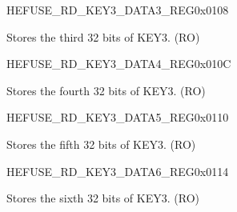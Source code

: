 \begin{register}{H}{EFUSE\_RD\_KEY3\_DATA3\_REG}{0x0108}\label{regdesc:EFUSERDKEY3DATA3REG}
%
\regnewline%
\begin{regdesc}\begin{reglist}
\label{fielddesc:EFUSEKEY3DATA3}\item [EFUSE\_KEY3\_DATA3] Stores the third 32 bits of KEY3. (RO)
\end{reglist}\end{regdesc}
\end{register}


\begin{register}{H}{EFUSE\_RD\_KEY3\_DATA4\_REG}{0x010C}\label{regdesc:EFUSERDKEY3DATA4REG}
%
\regnewline%
\begin{regdesc}\begin{reglist}
\label{fielddesc:EFUSEKEY3DATA4}\item [EFUSE\_KEY3\_DATA4] Stores the fourth 32 bits of KEY3. (RO)
\end{reglist}\end{regdesc}
\end{register}


\begin{register}{H}{EFUSE\_RD\_KEY3\_DATA5\_REG}{0x0110}\label{regdesc:EFUSERDKEY3DATA5REG}
%
\regnewline%
\begin{regdesc}\begin{reglist}
\label{fielddesc:EFUSEKEY3DATA5}\item [EFUSE\_KEY3\_DATA5] Stores the fifth 32 bits of KEY3. (RO)
\end{reglist}\end{regdesc}
\end{register}


\begin{register}{H}{EFUSE\_RD\_KEY3\_DATA6\_REG}{0x0114}\label{regdesc:EFUSERDKEY3DATA6REG}
%
\regnewline%
\begin{regdesc}\begin{reglist}
\label{fielddesc:EFUSEKEY3DATA6}\item [EFUSE\_KEY3\_DATA6] Stores the sixth 32 bits of KEY3. (RO)
\end{reglist}\end{regdesc}
\end{register}


